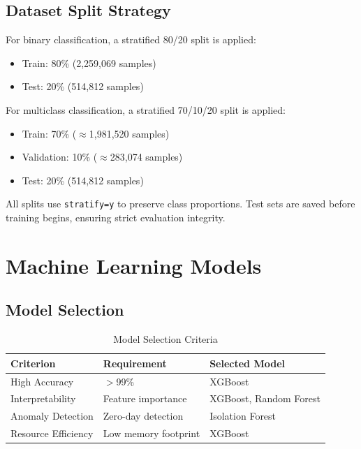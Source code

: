 \documentclass[12pt,a4paper]{article}
\begin{document}
\subsection{Dataset Split Strategy}

For binary classification, a stratified 80/20 split is applied:
\begin{itemize}
    \item Train: 80\% (2,259,069 samples)
    \item Test: 20\% (514,812 samples)
\end{itemize}

For multiclass classification, a stratified 70/10/20 split is applied:
\begin{itemize}
    \item Train: 70\% ($\approx$1,981,520 samples)
    \item Validation: 10\% ($\approx$283,074 samples)
    \item Test: 20\% (514,812 samples)
\end{itemize}

All splits use \texttt{stratify=y} to preserve class proportions. Test sets are saved before training begins, ensuring strict evaluation integrity.

\section{Machine Learning Models}

\subsection{Model Selection}

\begin{table}[H]
\centering
\caption{Model Selection Criteria}
\label{tab:model_selection}
\begin{tabular}{|p{3cm}|p{4cm}|p{4cm}|}
\hline
\textbf{Criterion} & \textbf{Requirement} & \textbf{Selected Model} \\
\hline
High Accuracy & $>$99\% & XGBoost \\
Interpretability & Feature importance & XGBoost, Random Forest \\
Anomaly Detection & Zero-day detection & Isolation Forest \\
Resource Efficiency & Low memory footprint & XGBoost \\
\hline
\end{tabular}
\end{table}
\end{document}
